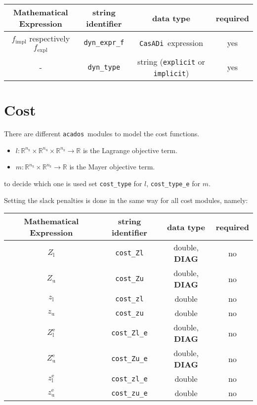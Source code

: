 \documentclass{article}
\newcommand{\code}[1]{\texttt{#1}}
\newcommand{\casadi}{\texttt{CasADi}}
\newcommand{\acados}{\texttt{acados}}
\newcommand{\ind}[1]{_{\textrm{#1}}}
\newcommand{\terminal}{^{\textrm{e}}}
\newcommand{\Lower}{\ind{l}}
\newcommand{\upper}{\ind{u}}
\newcommand{\nx}{n\ind{x}}
\newcommand{\nuu}{n\ind{u}}
\newcommand{\nz}{n\ind{z}}
\begin{document}
\newcommand{\mandatory}{yes}
\newcommand{\optional}{no}
\begin{table}[h!]
	\centering
	\begin{tabular}{|c|c|c|c|}
		\toprule
		Mathematical Expression & string identifier & data type & required \\ \midrule
		$ f\ind{impl} $ respectively $ f\ind{expl} $ & \code{dyn\_expr\_f}    & \casadi~expression & \mandatory \\ \midrule
		- & \code{dyn\_type}    & string (\code{explicit} or \code{implicit}) & \mandatory \\
		\bottomrule
	\end{tabular}
\end{table}


\section{Cost}
There are different \acados~modules to model the cost functions.
\begin{itemize}
\item $ l: \mathbb{R}^{\nx}\times\mathbb{R}^{\nuu}\times\mathbb{R}^{\nz} \rightarrow \mathbb{R}$ is the Lagrange objective term.
\item $ m: \mathbb{R}^{\nx}\times\mathbb{R}^{\nz} \rightarrow \mathbb{R} $ is the Mayer objective term.
\end{itemize}
to decide which one is used set \code{cost\_type} for $ l $, \code{cost\_type\_e} for $ m $.

Setting the slack penalties is done in the same way for all cost modules, namely:
\begin{table}[h!]
	\centering
	\begin{tabular}{|c|c|c|c|}
		\toprule
		Mathematical Expression  & string identifier & data type & required \\ \midrule
		$ Z\Lower $ & \code{cost\_Zl}    & double, \textbf{DIAG}  & \optional \\ \midrule
		$ Z\upper $ & \code{cost\_Zu}    & double, \textbf{DIAG}  & \optional   \\ \midrule
		$ z\Lower $ & \code{cost\_zl}    & double  & \optional   \\ \midrule
		$ z\upper $ & \code{cost\_zu}    & double  & \optional   \\ \midrule
		$ Z\Lower\terminal $ & \code{cost\_Zl\_e}    & double, \textbf{DIAG} & \optional   \\ \midrule
		$ Z\upper\terminal $ & \code{cost\_Zu\_e}    & double, \textbf{DIAG} & \optional   \\ \midrule
		$ z\Lower\terminal $ & \code{cost\_zl\_e}    & double  & \optional   \\ \midrule
		$ z\upper\terminal $ & \code{cost\_zu\_e}    & double  & \optional   \\
		\bottomrule
	\end{tabular}
\end{table}
\end{document}
